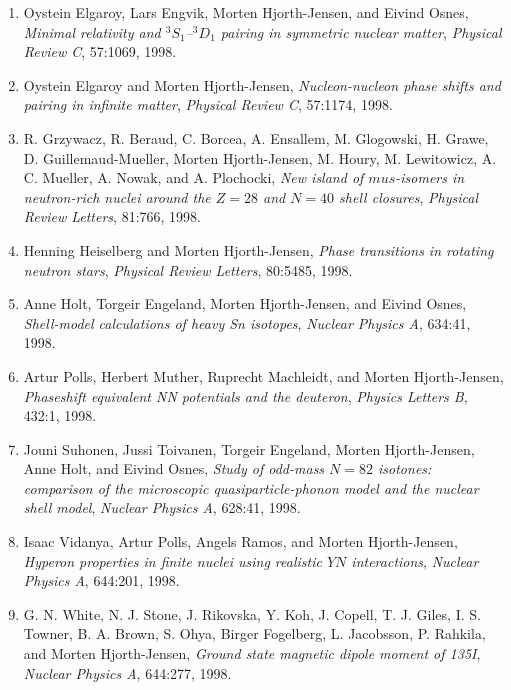 \documentclass[%
oneside,                 %
final,                   %
10pt]{article}
\begin{document}
\begin{enumerate}
\item Oystein Elgaroy, Lars Engvik, Morten Hjorth-Jensen, and Eivind Osnes, \emph{Minimal relativity and $^3S_1$--$^3D_1$ pairing in symmetric   nuclear matter},  \emph{Physical Review C}, 57:1069, 1998. 

\item Oystein Elgaroy and Morten Hjorth-Jensen, \emph{Nucleon-nucleon phase shifts and pairing in infinite matter},  \emph{Physical Review C}, 57:1174, 1998. 

\item R. Grzywacz, R. Beraud, C. Borcea, A. Ensallem, M. Glogowski, H. Grawe,   D. Guillemaud-Mueller, Morten Hjorth-Jensen, M. Houry, M. Lewitowicz, A. C.   Mueller, A. Nowak, and A. Plochocki, \emph{New island of $mu s$-isomers in neutron-rich nuclei around the   $Z=28$ and $N=40$ shell closures}, \emph{Physical Review Letters}, 81:766, 1998. 

\item Henning Heiselberg and Morten Hjorth-Jensen, \emph{Phase transitions in rotating neutron stars},  \emph{Physical Review Letters}, 80:5485, 1998. 

\item Anne Holt, Torgeir Engeland, Morten Hjorth-Jensen, and Eivind Osnes, \emph{Shell-model calculations of heavy Sn isotopes},  \emph{Nuclear Physics A}, 634:41, 1998. 

\item Artur Polls, Herbert Muther, Ruprecht Machleidt, and Morten Hjorth-Jensen, \emph{Phaseshift equivalent NN potentials and the deuteron},  \emph{Physics Letters B}, 432:1, 1998. 

\item Jouni Suhonen, Jussi Toivanen, Torgeir Engeland, Morten Hjorth-Jensen, Anne   Holt, and Eivind Osnes, \emph{Study of odd-mass $N=82$ isotones: comparison of the microscopic   quasiparticle-phonon model and the nuclear shell model},  \emph{Nuclear Physics A}, 628:41, 1998. 

\item Isaac Vidanya, Artur Polls, Angels Ramos, and Morten Hjorth-Jensen, \emph{Hyperon properties in finite nuclei using realistic $YN$ interactions},  \emph{Nuclear Physics A}, 644:201, 1998. 

\item G. N. White, N. J. Stone, J. Rikovska, Y. Koh, J. Copell, T. J. Giles, I. S. Towner, B. A. Brown, S. Ohya, Birger Fogelberg, L. Jacobsson, P. Rahkila, and Morten Hjorth-Jensen, \emph{Ground state magnetic dipole moment of 135I},  \emph{Nuclear Physics A}, 644:277, 1998. 


\end{enumerate}
\end{document}
